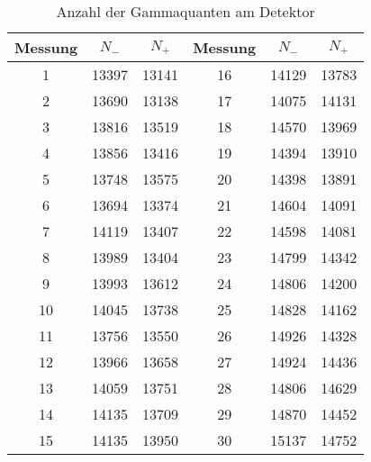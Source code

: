 \begin{table}[!htb]
    \centering
    \caption{Anzahl der Gammaquanten am Detektor}
    \label{}
    \begin{tabular}{c c c c c c}\\
\toprule
Messung & $N_{-}$ & $N_{+}$ & Messung & $N_{-}$  & $N_{+}$ \\
\hline
1 & 13397 & 13141 & 16 & 14129 & 13783\\
2 & 13690 & 13138 & 17 & 14075 & 14131\\
3 & 13816 & 13519 & 18 & 14570 & 13969\\
4 & 13856 & 13416 & 19 & 14394 & 13910\\
5 & 13748 & 13575 & 20 & 14398 & 13891\\
6 & 13694 & 13374 & 21 & 14604 & 14091\\
7 & 14119 & 13407 & 22 & 14598 & 14081\\
8 & 13989 & 13404 & 23 & 14799 & 14342\\
9 & 13993 & 13612 & 24 & 14806 & 14200\\
10 & 14045 & 13738 & 25 & 14828 & 14162\\
11 & 13756 & 13550 & 26 & 14926 & 14328\\
12 & 13966 & 13658 & 27 & 14924 & 14436\\
13 & 14059 & 13751 & 28 & 14806 & 14629\\
14 & 14135 & 13709 & 29 & 14870 & 14452\\ 
15 & 14135 & 13950 & 30 & 15137 & 14752\\
\bottomrule
    \end{tabular}
\end{table}



